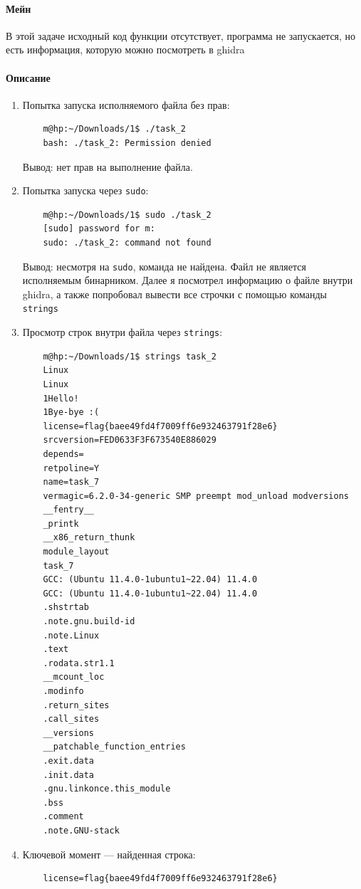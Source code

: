 \paragraph{Мейн}
В этой задаче исходный код функции отсутствует, программа не запускается, но есть информация, которую можно посмотреть в ghidra

\paragraph{Описание}
\begin{enumerate}
    \item Попытка запуска исполняемого файла без прав:
    \begin{verbatim}
    m@hp:~/Downloads/1$ ./task_2
    bash: ./task_2: Permission denied
    \end{verbatim}
    Вывод: нет прав на выполнение файла.

    \item Попытка запуска через \texttt{sudo}:
    \begin{verbatim}
    m@hp:~/Downloads/1$ sudo ./task_2
    [sudo] password for m:
    sudo: ./task_2: command not found
    \end{verbatim}
    Вывод: несмотря на \texttt{sudo}, команда не найдена.
    Файл не является исполняемым бинарником.
    Далее я посмотрел информацию о файле внутри ghidra, а также попробовал вывести все строчки с помощью команды \texttt{strings}
    \item Просмотр строк внутри файла через \texttt{strings}:
    \begin{verbatim}
    m@hp:~/Downloads/1$ strings task_2
    Linux
    Linux
    1Hello!
    1Bye-bye :(
    license=flag{baee49fd4f7009ff6e932463791f28e6}
    srcversion=FED0633F3F673540E886029
    depends=
    retpoline=Y
    name=task_7
    vermagic=6.2.0-34-generic SMP preempt mod_unload modversions
    __fentry__
    _printk
    __x86_return_thunk
    module_layout
    task_7
    GCC: (Ubuntu 11.4.0-1ubuntu1~22.04) 11.4.0
    GCC: (Ubuntu 11.4.0-1ubuntu1~22.04) 11.4.0
    .shstrtab
    .note.gnu.build-id
    .note.Linux
    .text
    .rodata.str1.1
    __mcount_loc
    .modinfo
    .return_sites
    .call_sites
    __versions
    __patchable_function_entries
    .exit.data
    .init.data
    .gnu.linkonce.this_module
    .bss
    .comment
    .note.GNU-stack
    \end{verbatim}

    \item Ключевой момент — найденная строка:
    \begin{verbatim}
    license=flag{baee49fd4f7009ff6e932463791f28e6}
    \end{verbatim}
\end{enumerate}

